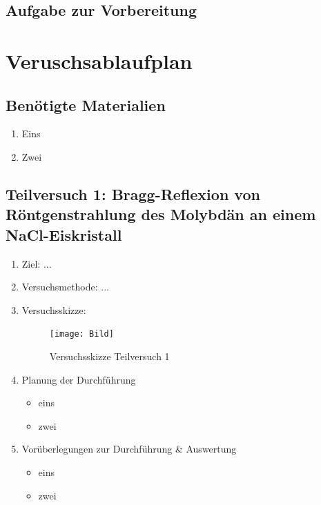 \documentclass{article}
\begin{document}
\subsection{Aufgabe zur Vorbereitung}

\newpage

\section{Veruschsablaufplan}

\subsection{Benötigte Materialien}
    \begin{enumerate}[label=\arabic*.]
        \item Eins
        \item Zwei
    \end{enumerate}

\newpage

\subsection{Teilversuch 1: Bragg-Reflexion von Röntgenstrahlung des Molybdän an einem NaCl-Eiskristall}
\begin{enumerate}[label = (\Roman*)]
    \item Ziel: ...
    
    \item Versuchsmethode: ...
    
    \item Versuchsskizze:
    
        \begin{figure}[H]
        \centering
        \texttt{[image: Bild]}
        \caption{Versuchsskizze Teilversuch 1}
        \end{figure}

    \item Planung der Durchführung
        \begin{itemize}
            \item eins
            \item zwei
        \end{itemize}

    \item Vorüberlegungen zur Durchführung \& Auswertung
        \begin{itemize}
            \item eins
            \item zwei
        \end{itemize}
    
\end{enumerate}
\end{document}
